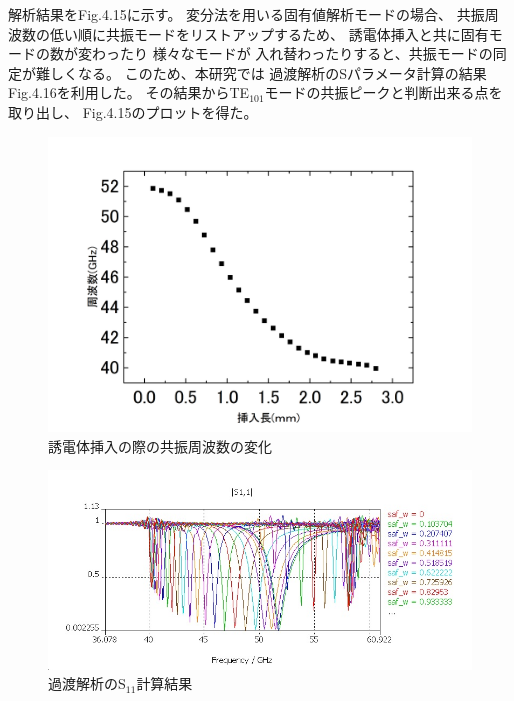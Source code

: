 解析結果をFig.4.15に示す。
変分法を用いる固有値解析モードの場合、
共振周波数の低い順に共振モードをリストアップするため、
誘電体挿入と共に固有モードの数が変わったり
様々なモードが
入れ替わったりすると、共振モードの同定が難しくなる。
このため、本研究では
過渡解析のSパラメータ計算の結果Fig.4.16を利用した。
その結果からTE$_{101}$モードの共振ピークと判断出来る点を取り出し、
Fig.4.15のプロットを得た。

\vspace{10 mm}

\begin{figure}[h]
  \begin{center}
    \includegraphics[width=12cm]{./image/plot2.jpg}
    \caption{誘電体挿入の際の共振周波数の変化}
    \label{fig:result}
  \end{center}
\end{figure}

\begin{figure}[h]
  \begin{center}
    \includegraphics[width=16cm]{./image/sweepS11.jpg}
    \caption{過渡解析のS$_{11}$計算結果}
    \label{fig:result}
  \end{center}
\end{figure}

